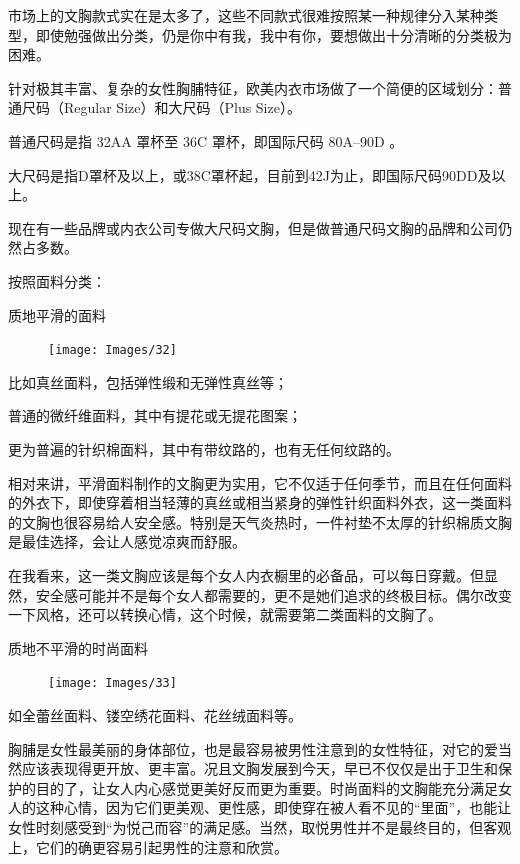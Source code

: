 \documentclass[12pt,UTF8]{ctexbook}
\begin{document}
市场上的文胸款式实在是太多了，这些不同款式很难按照某一种规律分入某种类型，即使勉强做出分类，仍是你中有我，我中有你，要想做出十分清晰的分类极为困难。

针对极其丰富、复杂的女性胸脯特征，欧美内衣市场做了一个简便的区域划分：普通尺码（Regular Size）和大尺码（Plus Size）。

普通尺码是指 32AA 罩杯至 36C 罩杯，即国际尺码 80A--90D 。

大尺码是指D罩杯及以上，或38C罩杯起，目前到42J为止，即国际尺码90DD及以上。

现在有一些品牌或内衣公司专做大尺码文胸，但是做普通尺码文胸的品牌和公司仍然占多数。

按照面料分类：

质地平滑的面料

\begin{figure}[htbp]
	\centering
	\texttt{[image: Images/32]}
	\caption{}
	\label{fig:1}
\end{figure}

比如真丝面料，包括弹性缎和无弹性真丝等；

普通的微纤维面料，其中有提花或无提花图案；

更为普遍的针织棉面料，其中有带纹路的，也有无任何纹路的。

相对来讲，平滑面料制作的文胸更为实用，它不仅适于任何季节，而且在任何面料的外衣下，即使穿着相当轻薄的真丝或相当紧身的弹性针织面料外衣，这一类面料的文胸也很容易给人安全感。特别是天气炎热时，一件衬垫不太厚的针织棉质文胸是最佳选择，会让人感觉凉爽而舒服。

在我看来，这一类文胸应该是每个女人内衣橱里的必备品，可以每日穿戴。但显然，安全感可能并不是每个女人都需要的，更不是她们追求的终极目标。偶尔改变一下风格，还可以转换心情，这个时候，就需要第二类面料的文胸了。

质地不平滑的时尚面料

\begin{figure}[htbp]
	\centering
	\texttt{[image: Images/33]}
	\caption{}
	\label{fig:1}
\end{figure}

如全蕾丝面料、镂空绣花面料、花丝绒面料等。

胸脯是女性最美丽的身体部位，也是最容易被男性注意到的女性特征，对它的爱当然应该表现得更开放、更丰富。况且文胸发展到今天，早已不仅仅是出于卫生和保护的目的了，让女人内心感觉更美好反而更为重要。时尚面料的文胸能充分满足女人的这种心情，因为它们更美观、更性感，即使穿在被人看不见的“里面”，也能让女性时刻感受到“为悦己而容”的满足感。当然，取悦男性并不是最终目的，但客观上，它们的确更容易引起男性的注意和欣赏。
\end{document}
